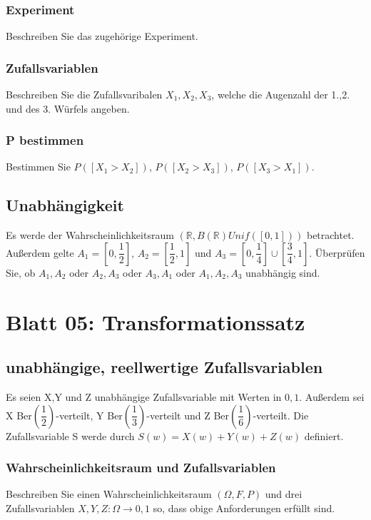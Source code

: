 \documentclass[paper=a4, fontsize=11pt]{scrartcl}
\numberwithin{equation}{section}
\numberwithin{figure}{section}
\numberwithin{table}{section}
\begin{document}
\subsubsection{Experiment}
Beschreiben Sie das zugehörige Experiment. \\

\subsubsection{Zufallsvariablen}
Beschreiben Sie die Zufallsvaribalen $X_{1},X_{2},X_{3}$, welche die Augenzahl der 1.,2. und des 3. Würfels angeben. \\

\subsubsection{P bestimmen}
Bestimmen Sie $P([X_{1} > X_{2}])$, $P([X_{2} > X_{3}])$, $P([X_{3} > X_{1}])$. \\

\subsection{Unabhängigkeit}
Es werde der Wahrscheinlichkeitsraum $(\mathbb{R},B(\mathbb{R})Unif([0,1]))$ betrachtet. Außerdem gelte $A_{1}=[0, \dfrac{1}{2}]$, $A_{2}=[\dfrac{1}{2},1]$ und $A_{3}=[0,\dfrac{1}{4}] \cup [\dfrac{3}{4},1]$. Überprüfen Sie, ob $A_{1},A_{2}$ oder $A_{2},A_{3}$ oder $A_{3},A_{1}$ oder $A_{1},A_{2},A_{3}$ unabhängig sind. \\

\section{Blatt 05: Transformationssatz}
\subsection{unabhängige, reellwertige Zufallsvariablen}
Es seien X,Y und Z unabhängige Zufallsvariable mit Werten in ${0,1}$. Außerdem sei X Ber$(\dfrac{1}{2})$-verteilt, Y Ber$(\dfrac{1}{3})$-verteilt und Z Ber$(\dfrac{1}{6})$-verteilt. Die Zufallsvariable S werde durch $S(w)=X(w)+Y(w)+Z(w)$ definiert.

\subsubsection{Wahrscheinlichkeitsraum und Zufallsvariablen}
Beschreiben Sie einen Wahrscheinlichkeitsraum $(\Omega, F, P)$ und drei Zufallsvariablen $X,Y,Z: \Omega \rightarrow {0,1}$ so, dass obige Anforderungen erfüllt sind. \\
\end{document}
